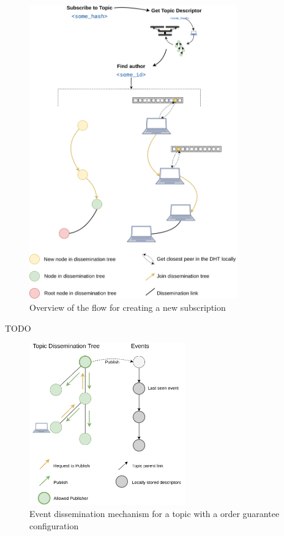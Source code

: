 \begin{figure}[hb!]
  \centering
  \includegraphics[width=0.8\textwidth]{img/pulsarcast-subscription-flow.png}
  \caption{Overview of the flow for creating a new subscription}
  \label{fig:pulsarcast-subscription-flow}
\end{figure}

TODO

\begin{figure}[hb!]
  \centering
  \includegraphics[width=0.6\textwidth]{img/pulsarcast-publish-order-guarantee.png}
  \caption{Event dissemination mechanism for a topic with a order guarantee configuration}
  \label{fig:pulsarcast-publish-order-guarantee}
\end{figure}

